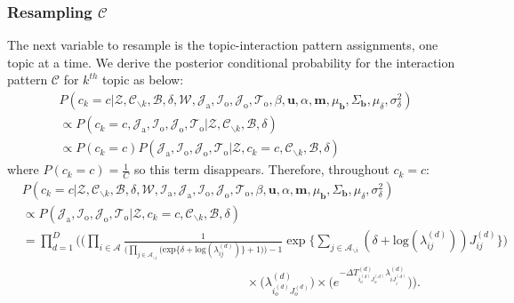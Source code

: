 \documentclass[a4paper]{article}
\begin{document}
   \subsubsection{Resampling $\mathcal{C}$} \label{subsec: Resampling C}
   The next variable to resample is the topic-interaction pattern assignments, one topic at a time. We derive the posterior conditional probability for the interaction pattern $\mathcal{C}$ for $k^{th}$ topic as below:
   \begin{equation}
   \begin{aligned} & P(c_k=c|\mathcal{Z},   \mathcal{C}_{\backslash k},   \mathcal{B},\delta,\mathcal{W}, \mathcal{J}_{\mbox{a}}, \mathcal{I}_{\mbox{o}}, \mathcal{J}_{\mbox{o}}, \mathcal{T}_{\mbox{o}}, \beta, \boldsymbol{u}, \alpha, \boldsymbol{m},  \mu_{\boldsymbol{b}}, \Sigma_{\boldsymbol{b}}, \mu_\delta, \sigma^2_\delta)\\
   &\propto P(c_k=c, \mathcal{J}_{\mbox{a}}, \mathcal{I}_{\mbox{o}}, \mathcal{J}_{\mbox{o}}, \mathcal{T}_{\mbox{o}}|\mathcal{Z}, \mathcal{C}_{\backslash k},   \mathcal{B},\delta)\\
   & \propto P(c_k=c)P(\mathcal{J}_{\mbox{a}}, \mathcal{I}_{\mbox{o}}, \mathcal{J}_{\mbox{o}}, \mathcal{T}_{\mbox{o}}| \mathcal{Z}, c_k=c, \mathcal{C}_{\backslash k}, \mathcal{B}, \delta)
   \end{aligned}
   \end{equation}
   where $P(c_k=c) = \frac{1}{C}$ so this term disappears. Therefore, throughout $c_k=c$:
   \begin{equation}
   \begin{aligned}
   &P(c_k=c|\mathcal{Z},   \mathcal{C}_{\backslash k},   \mathcal{B}, \delta, \mathcal{W}, \mathcal{I}_{\mbox{a}}, \mathcal{J}_{\mbox{a}}, \mathcal{I}_{\mbox{o}}, \mathcal{J}_{\mbox{o}}, \mathcal{T}_{\mbox{o}}, \beta, \boldsymbol{u}, \alpha, \boldsymbol{m},  \mu_{\boldsymbol{b}}, \Sigma_{\boldsymbol{b}}, \mu_\delta, \sigma^2_\delta)\\&\propto P( \mathcal{J}_{\mbox{a}}, \mathcal{I}_{\mbox{o}}, \mathcal{J}_{\mbox{o}}, \mathcal{T}_{\mbox{o}}| \mathcal{Z}, c_k=c, \mathcal{C}_{\backslash k}, \mathcal{B}, \delta)\\&=\prod_{d=1}^D\Bigg(\Big(\prod_{i\in \mathcal{A}} \frac{1}{\Big(\prod_{j \in \mathcal{A}_{\backslash i}} \Big(\mbox{exp}\{\delta+\mbox{log}(\lambda_{ij}^{(d)})\} + 1\Big)\Big)-1}\exp\Big\{\sum_{j \in \mathcal{A}_{\backslash i}} (\delta+\mbox{log}(\lambda_{ij}^{(d)}))J_{ij}^{(d)} \Big\}\Big)\\&\quad\quad\quad\quad\quad\quad\quad\quad\quad\quad\quad\quad\quad\quad\quad\quad\quad\quad\times \Big(\lambda^{(d)}_{i_o^{(d)}J_{o}^{(d)}}\Big)\times \Big(e^{-\Delta T^{(d)}_{i_o^{(d)}J_o^{(d)}}\lambda^{(d)}_{iJ^{(d)}_{i}}}\Big)\Bigg).
   \end{aligned}
   \end{equation} 
\end{document}
